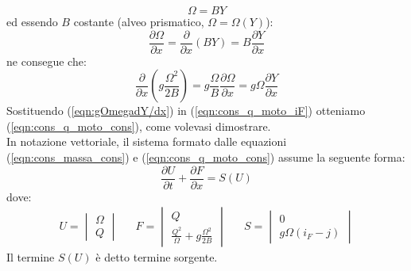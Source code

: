 \documentclass[12pt]{article} %
\begin{document}
\begin{equation}
    \Omega=B Y
    \label{eqn:Omega}
\end{equation}
\noindent ed essendo $B$ costante (alveo prismatico, $\Omega = \Omega(Y)$):
\begin{equation}
    \frac{\partial \Omega}{\partial x}=\frac{\partial }{\partial x}\left(BY\right)=B\frac{\partial Y}{\partial x}
    \label{eqn:dOmega/dx}
\end{equation}
\noindent ne consegue che:
\begin{equation}
    \frac{\partial}{\partial x}\left(g\frac{\Omega^2}{2B}\right)=g\frac{\Omega}{B}\frac{\partial \Omega}{\partial x}=g\Omega\frac{\partial Y}{\partial x}
    \label{eqn:gOmegadY/dx}
\end{equation}
\noindent Sostituendo (\ref{eqn:gOmegadY/dx}) in (\ref{eqn:cons_q_moto_iF}) otteniamo (\ref{eqn:cons_q_moto_cons}), come volevasi dimostrare.\\
\noindent In notazione vettoriale, il sistema formato dalle equazioni (\ref{eqn:cons_massa_cons}) e (\ref{eqn:cons_q_moto_cons}) assume la seguente forma:
\begin{equation}
    \frac{\partial U}{\partial t}+\frac{\partial F}{\partial x}  = S(U)
    \label{eqn:forma_cons_vett}
\end{equation}
\noindent dove:
\begin{align*}
    U=\begin{vmatrix}\Omega\\Q\end{vmatrix} &&
    F=\begin{vmatrix}Q\\\frac{Q^2}{\Omega}+g\frac{\Omega^2}{2B}\end{vmatrix} &&
    S=\begin{vmatrix}0\\g\Omega(i_F-j)\end{vmatrix}
\end{align*}
\noindent Il termine $S(U)$ è detto termine sorgente. 
\end{document}
